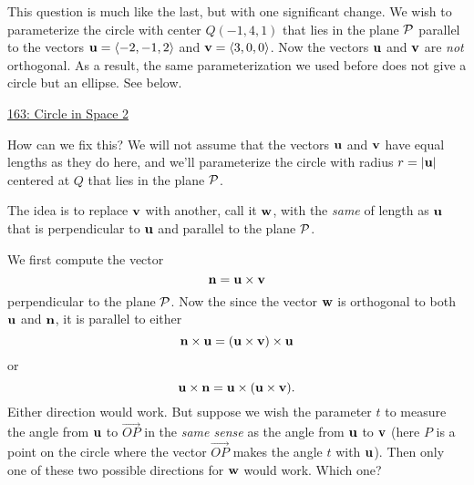 \documentclass{ximera}
\begin{document}
\begin{question}  \label{Q98de983234}
This question is much like the last, but with one significant change. We wish to parameterize the circle with center $Q(-1,4,1)$ that lies in the plane ${\cal P}$ parallel to the vectors ${\bf u} = \langle -2, -1, 2 \rangle$ and ${\bf v}= \langle 3,0,0 \rangle$. 
Now the vectors ${\bf u}$ and ${\bf v}$ are \emph{not} orthogonal. As a result, the same parameterization we used before does not give a circle but an ellipse. See below.

\begin{onlineOnly}
    \begin{center}
\end{center}
\end{onlineOnly}

\href{https://www.desmos.com/3d/k5idcpjrep}{163: Circle in Space 2}

How can we fix this? We will not assume that the vectors ${\bf u}$ and ${\bf v}$ have equal lengths as they do here, and we'll parameterize the circle with radius $r = |{\bf u}|$ centered at $Q$ that lies in the plane ${\cal P}$. 

The idea is to replace ${\bf v}$ with another, call it ${\bf w}$, with the \emph{same} of length as ${\bf u}$ that is perpendicular to ${\bf u}$ and parallel to the plane ${\cal P}$. 

\begin{explanation}
We first compute the vector
\[
   {\bf n} = {\bf u}\times {\bf v}
\]
perpendicular to the plane ${\cal P}$. Now the since the vector ${\bf w}$ is orthogonal to both ${\bf u}$ and ${\bf n}$, it is parallel to either%
\[
      {\bf n} \times {\bf u} = ({\bf u}\times {\bf v})\times {\bf u}
\] 
or
\[
       {\bf u} \times {\bf n} =  {\bf u} \times ({\bf u}\times {\bf v}) .
\]
Either direction would work. But suppose we wish the parameter $t$ to measure the angle from ${\bf u}$ to $\overrightarrow{OP}$ in the \emph{same sense} as the angle from ${\bf u}$ to ${\bf v}$ (here $P$ is a point on the circle where the vector  $\overrightarrow{OP}$ makes the angle $t$ with ${\bf u}$). Then only one of these two possible directions for ${\bf w}$ would work. Which one?
\begin{multipleChoice}
\end{multipleChoice}


\end{explanation}
\end{question}
\end{document}
